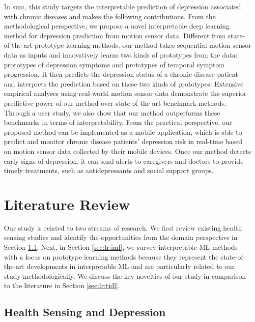 \documentclass[mnsc]{informs3b} %
\begin{document}
In sum, this study targets the interpretable prediction of depression associated with chronic diseases and makes the following contributions. From the methodological perspective, we propose a novel interpretable deep learning method for depression prediction from motion sensor data. Different from state-of-the-art prototype learning methods, our method takes sequential motion sensor data as inputs and innovatively learns two kinds of prototypes from the data: prototypes of depression symptoms  and prototypes of temporal symptom progression. It then predicts the depression status of a chronic disease patient and interprets the prediction based on these two kinds of prototypes. Extensive empirical analyses using real-world motion sensor data demonstrate the superior predictive power of our method over state-of-the-art benchmark methods. Through a user study, we also show that our method outperforms these benchmarks in terms of interpretability. 
From the practical perspective, our proposed method can be implemented as a mobile application, which is able to predict and monitor chronic disease patients’ depression risk in real-time based on motion sensor data collected by their mobile devices. Once our method detects early signs of depression, it can send alerts to caregivers and doctors to provide timely treatments, such as antidepressants and social support groups.


\section{Literature Review} \label{sec:lr}

Our study is related to two streams of research. We first review existing health sensing studies and identify the opportunities from the domain perspective in Section \ref{sec:lr:hsd}. Next, in Section \ref{sec:lr:iml}, we survey interpretable ML methods with a focus on prototype learning methods because they represent the state-of-the-art developments in interpretable ML and are particularly related to our study methodologically. We discuss the key novelties of our study in comparison to the literature in Section \ref{sec:lr:tidl}.

\subsection{Health Sensing and Depression}\label{sec:lr:hsd}
\end{document}
